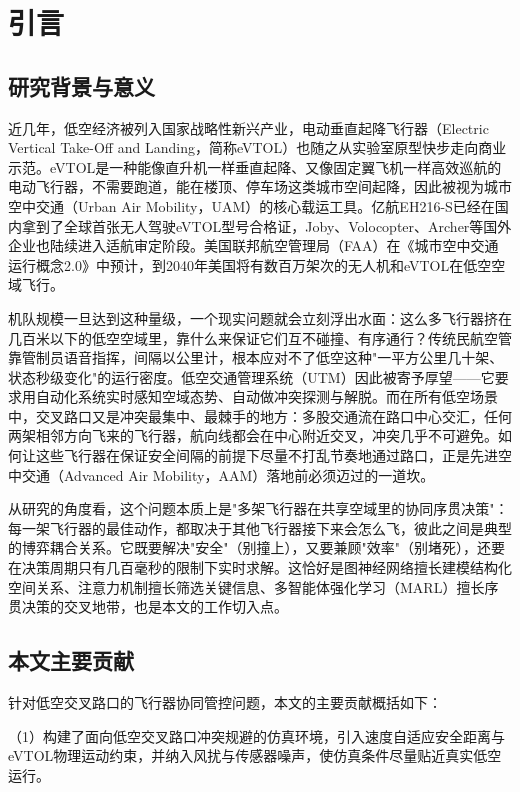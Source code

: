 \documentclass[12pt,a4paper,UTF8]{ctexart}
\begin{document}
\section{引言}

\subsection{研究背景与意义}

近几年，低空经济被列入国家战略性新兴产业，电动垂直起降飞行器（Electric Vertical Take-Off and Landing，简称eVTOL）也随之从实验室原型快步走向商业示范。eVTOL是一种能像直升机一样垂直起降、又像固定翼飞机一样高效巡航的电动飞行器，不需要跑道，能在楼顶、停车场这类城市空间起降，因此被视为城市空中交通（Urban Air Mobility，UAM）\cite{ref45}的核心载运工具。亿航EH216-S已经在国内拿到了全球首张无人驾驶eVTOL型号合格证，Joby、Volocopter、Archer等国外企业也陆续进入适航审定阶段。美国联邦航空管理局（FAA）在《城市空中交通运行概念2.0》中预计，到2040年美国将有数百万架次的无人机和eVTOL在低空空域飞行\cite{ref1}。

机队规模一旦达到这种量级，一个现实问题就会立刻浮出水面：这么多飞行器挤在几百米以下的低空空域里，靠什么来保证它们互不碰撞、有序通行？传统民航空管靠管制员语音指挥，间隔以公里计，根本应对不了低空这种"一平方公里几十架、状态秒级变化"的运行密度。低空交通管理系统（UTM）因此被寄予厚望——它要求用自动化系统实时感知空域态势、自动做冲突探测与解脱。而在所有低空场景中，交叉路口又是冲突最集中、最棘手的地方：多股交通流在路口中心交汇，任何两架相邻方向飞来的飞行器，航向线都会在中心附近交叉，冲突几乎不可避免。如何让这些飞行器在保证安全间隔的前提下尽量不打乱节奏地通过路口，正是先进空中交通（Advanced Air Mobility，AAM）落地前必须迈过的一道坎。

从研究的角度看，这个问题本质上是"多架飞行器在共享空域里的协同序贯决策"：每一架飞行器的最佳动作，都取决于其他飞行器接下来会怎么飞，彼此之间是典型的博弈耦合关系。它既要解决"安全"（别撞上），又要兼顾"效率"（别堵死），还要在决策周期只有几百毫秒的限制下实时求解。这恰好是图神经网络擅长建模结构化空间关系、注意力机制擅长筛选关键信息、多智能体强化学习（MARL）擅长序贯决策的交叉地带，也是本文的工作切入点。

\subsection{本文主要贡献}

针对低空交叉路口的飞行器协同管控问题，本文的主要贡献概括如下：

（1）构建了面向低空交叉路口冲突规避的仿真环境，引入速度自适应安全距离与eVTOL物理运动约束，并纳入风扰与传感器噪声，使仿真条件尽量贴近真实低空运行。
\end{document}
